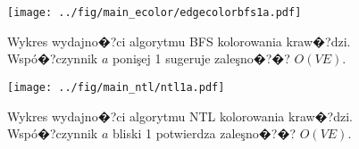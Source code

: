 \documentclass[12pt,a4paper]{mwrep}
\begin{document}
\begin{figure}
\centering
\texttt{[image: ../fig/main\_ecolor/edgecolorbfs1a.pdf]}
\caption[Wydajno�?�? algorytmu BFS kolorowania kraw�?dzi.]{
\label{fig:edge_color_bfs}
Wykres wydajno�?ci algorytmu BFS kolorowania kraw�?dzi.
Wspó�?czynnik $a$ ponişej 1 sugeruje zaleşno�?�? $O(V E)$.}
\end{figure}

\begin{figure}
\centering
\texttt{[image: ../fig/main\_ntl/ntl1a.pdf]}
\caption[Wydajno�?�? algorytmu NTL kolorowania kraw�?dzi.]{
\label{fig:edge_color_ntl}
Wykres wydajno�?ci algorytmu NTL kolorowania kraw�?dzi.
Wspó�?czynnik $a$ bliski 1 potwierdza zaleşno�?�? $O(V E)$.}
\end{figure}


\end{document}
